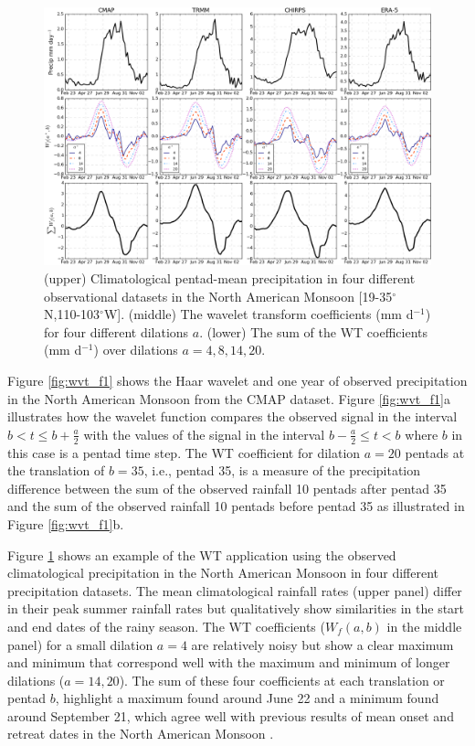 \begin{figure}[t!]
\centering
 \includegraphics[width=\linewidth]{figures/wav_paperfig2.png}
\caption[Wavelet transform coefficient in North American Monsoon]{ (upper) Climatological pentad-mean precipitation in four different observational datasets in the North American Monsoon [19-35$^\circ$N,110-103$^\circ$W]. (middle) The wavelet transform coefficients (mm d$^{-1}$) for four different dilations $a$. (lower) The sum of the WT coefficients (mm d$^{-1}$) over dilations $a={4,8,14,20}$. }
\label{fig:wvt_f2}
\end{figure}

Figure \ref{fig:wvt_f1} shows the Haar wavelet and one year of observed precipitation in the North American Monsoon from the CMAP dataset. Figure \ref{fig:wvt_f1}a illustrates how the wavelet function compares the observed signal in the interval $ b < t \leq b+\frac{a}{2}$ with the values of the signal in the interval $b-\frac{a}{2} \leq t < b$ where $b$ in this case is a pentad time step. The WT coefficient for dilation $a=20$ pentads at the translation of $b=35$, i.e., pentad 35, is a measure of the precipitation difference between the sum of the observed rainfall 10 pentads after pentad 35 and the sum of the observed rainfall 10 pentads before pentad 35 as illustrated in Figure \ref{fig:wvt_f1}b.


Figure \ref{fig:wvt_f2} shows an example of the WT application using the observed climatological precipitation in the North American Monsoon in four different precipitation datasets.
The mean climatological rainfall rates (upper panel) differ in their peak summer rainfall rates but qualitatively show similarities in the start and end dates of the rainy season. 
The WT coefficients ($W_f(a,b)$ in the middle panel) for a small dilation $a=4$ are relatively noisy but show a clear maximum and minimum that correspond well with the maximum and minimum of longer dilations ($a=14,20$). The sum of these four coefficients at each translation or pentad $b$, highlight a maximum found around June 22 and a minimum found around September 21, which agree well with previous results of mean onset and retreat dates in the North American Monsoon  \citep[e.g.][]{arias2012,geil2013}.


